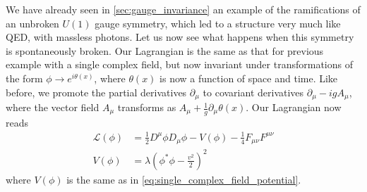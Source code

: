 We have already seen in \autoref{sec:gauge_invariance} an example of the ramifications of an unbroken $U(1)$ gauge symmetry, which led to a structure very much like QED, with massless photons. Let us now see what happens when this symmetry is spontaneously broken. Our Lagrangian is the same as that for previous example with a single complex field, but now invariant under transformations of the form $\phi\rightarrow e^{i\theta(x)}$, where $\theta(x)$ is now a function of space and time.  Like before, we promote the partial derivatives $\partial_\mu$ to covariant derivatives $\partial_\mu - igA_\mu$, where the vector field $A_\mu$ transforms as $A_\mu + \frac{1}{g}\partial_\mu\theta(x)$. Our Lagrangian now reads
\begin{align}
\mathcal{L}(\phi) &= \frac{1}{2} D^\mu\phi D_\mu\phi - V(\phi)-\frac{1}{4}F_{\mu\nu}F^{\mu\nu}\\
V(\phi) &= \lambda\left(\phi^*\phi - \frac{v^2}{2}\right)^2
\end{align}
where $V(\phi)$ is the same as in \autoref{eq:single_complex_field_potential}.

